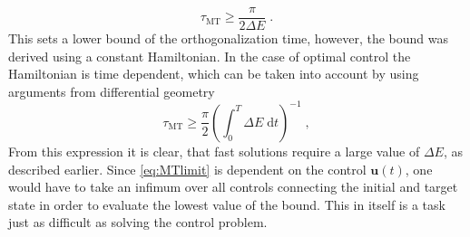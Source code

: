 \begin{equation}
	\tau_{\mathrm{MT}} \geq \frac{\pi}{2 \Delta E} \; .
\end{equation}
This sets a lower bound of the orthogonalization time, however, the bound was derived using a constant Hamiltonian. In the case of optimal control the Hamiltonian is time dependent, which can be taken into account by using arguments from differential geometry \cite{Aharonov,beyondQSL}
\begin{equation}
	\tau_{\mathrm{MT}} \geq \frac{\pi}{2} \left( \int_{0}^{T} \Delta E \; \mathrm{d}t \right) ^{-1} \; , \label{eq:MTlimit}
\end{equation}
From this expression it is clear, that fast solutions require a large value of $\Delta E$, as described earlier. Since \ref{eq:MTlimit} is dependent on the control $\boldsymbol{u}(t)$, one would have to take an infimum over all controls connecting the initial and target state in order to evaluate the lowest value of the bound. This in itself is a task just as difficult as solving the control problem.


